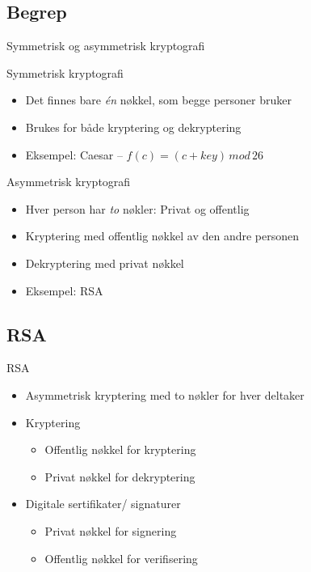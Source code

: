 \subsection*{Begrep}
\begin{frame}{Symmetrisk og asymmetrisk kryptografi}
\begin{block}{Symmetrisk kryptografi}
\begin{itemize}
\item Det finnes bare \textit{én} nøkkel, som begge personer bruker
\item Brukes for både kryptering og dekryptering
\item Eksempel: Caesar – $f(c) = (c+key)\, mod\, 26$
\end{itemize}
\end{block}
\pause
\begin{block}{Asymmetrisk kryptografi}
\begin{itemize}
\item Hver person har \textit{to} nøkler: Privat og offentlig
\item Kryptering med offentlig nøkkel av den andre personen
\item Dekryptering med privat nøkkel
\item Eksempel: RSA
\end{itemize}
\end{block}
\end{frame}

\subsection*{RSA}
\begin{frame}{RSA}
\begin{itemize}[<+->]
\item Asymmetrisk kryptering med to nøkler for hver deltaker
\item Kryptering
	\begin{itemize}
	\item Offentlig nøkkel for kryptering
	\item Privat nøkkel for dekryptering
	\end{itemize}
\item Digitale sertifikater/ signaturer
	\begin{itemize}
	\item Privat nøkkel for signering
	\item Offentlig nøkkel for verifisering
	\end{itemize}
\end{itemize}
\end{frame}


